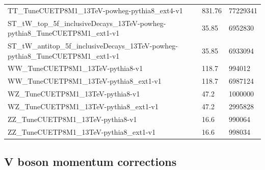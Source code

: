 \begin{table}[!htb]
\begin{tabular}{lll}
\hline
TT\_TuneCUETP8M1\_13TeV-powheg-pythia8\_ext4-v1 & 831.76 & 77229341 \\
ST\_tW\_top\_5f\_inclusiveDecays\_13TeV-powheg-pythia8\_TuneCUETP8M1\_ext1-v1 & 35.85 & 6952830\\
ST\_tW\_antitop\_5f\_inclusiveDecays\_13TeV-powheg-pythia8\_TuneCUETP8M1\_ext1-v1 & 35.85 & 6933094\\
\hline
WW\_TuneCUETP8M1\_13TeV-pythia8-v1 & 118.7 & 994012\\
WW\_TuneCUETP8M1\_13TeV-pythia8\_ext1-v1 & 118.7 & 6987124\\
WZ\_TuneCUETP8M1\_13TeV-pythia8-v1 & 47.2 & 1000000\\
WZ\_TuneCUETP8M1\_13TeV-pythia8\_ext1-v1 & 47.2 & 2995828\\
ZZ\_TuneCUETP8M1\_13TeV-pythia8-v1 & 16.6 & 990064 \\
ZZ\_TuneCUETP8M1\_13TeV-pythia8\_ext1-v1 & 16.6 & 998034\\
\hline


\end{tabular}
\end{table}

\clearpage

\subsection{V boson momentum corrections}

